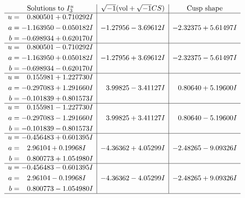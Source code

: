 \documentclass[1p]{elsarticle_modified}
\theoremstyle{definition}
\newcommand{\I}{\sqrt{-1}}
\begin{document}
$$\begin{array}{c|c|c}  
\text{Solutions to }I^u_{3}& \I (\text{vol} + \sqrt{-1}CS) & \text{Cusp shape}\\
 \hline 
\begin{aligned}
u &= \phantom{-}0.800501 + 0.710292 I \\
a &= -1.163950 - 0.050182 I \\
b &= -0.698934 + 0.620170 I\end{aligned}
 & -1.27956 - 3.69612 I & -2.32375 + 5.61497 I \\ \hline\begin{aligned}
u &= \phantom{-}0.800501 - 0.710292 I \\
a &= -1.163950 + 0.050182 I \\
b &= -0.698934 - 0.620170 I\end{aligned}
 & -1.27956 + 3.69612 I & -2.32375 - 5.61497 I \\ \hline\begin{aligned}
u &= \phantom{-}0.155981 + 1.227730 I \\
a &= -0.297083 + 1.291660 I \\
b &= -0.101839 + 0.801573 I\end{aligned}
 & \phantom{-}3.99825 - 3.41127 I & \phantom{-}0.80640 + 5.19600 I \\ \hline\begin{aligned}
u &= \phantom{-}0.155981 - 1.227730 I \\
a &= -0.297083 - 1.291660 I \\
b &= -0.101839 - 0.801573 I\end{aligned}
 & \phantom{-}3.99825 + 3.41127 I & \phantom{-}0.80640 - 5.19600 I \\ \hline\begin{aligned}
u &= -0.456483 + 0.601395 I \\
a &= \phantom{-}2.96104 + 0.19968 I \\
b &= \phantom{-}0.800773 + 1.054980 I\end{aligned}
 & -4.36362 + 4.05299 I & -2.48265 - 9.09326 I \\ \hline\begin{aligned}
u &= -0.456483 - 0.601395 I \\
a &= \phantom{-}2.96104 - 0.19968 I \\
b &= \phantom{-}0.800773 - 1.054980 I\end{aligned}
 & -4.36362 - 4.05299 I & -2.48265 + 9.09326 I\\
 \hline 
 \end{array}$$\newpage\newpage\renewcommand{\arraystretch}{1}
\end{document}
